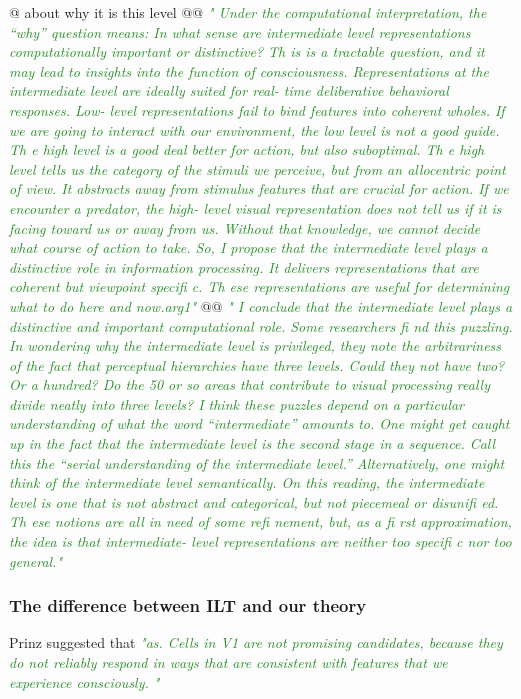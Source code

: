 \documentclass[utf8]{article}
\newenvironment{ants}
			{
			 \begin{easylist}[itemize]
			}
			{
			\end{easylist}
			}
\newcommand{\rewrite}[1]{\textcolor{ForestGreen}{\textit{"#1"}}\newline}
\begin{document}
\begin{ants}
			
				@ about why it is this level
				@@ \rewrite{
					Under the computational interpretation, the “why” question means: In what sense are intermediate level representations computationally important or distinctive? Th is is a tractable question, and it may lead to insights into the function of consciousness. Representations at the intermediate level are ideally suited for real- time deliberative behavioral responses. Low- level representations fail to bind features into coherent wholes. If we are going to interact with our environment, the low level is not a good guide. Th e high level is a good deal better for action, but also suboptimal. Th e high level tells us the category of the stimuli we perceive, but from an allocentric point of view. It abstracts away from stimulus features that are crucial for action. If we encounter a predator, the high- level visual representation does not tell us if it is facing toward us or away from us. Without that knowledge, we cannot decide what course of action to take. So, I propose that the intermediate level plays a distinctive role in information processing. It delivers representations that are coherent but viewpoint specifi c. Th ese representations are useful for determining what to do here and now.arg1} \cite{prinz2007intermediate}
				@@ \rewrite{
					I conclude that the intermediate level plays a distinctive and important computational role. Some researchers fi nd this puzzling. In wondering why the intermediate level is privileged, they note the arbitrariness of the fact that perceptual hierarchies have three levels. Could they not have two? Or a hundred? Do the 50 or so areas that contribute to visual processing really divide neatly into three levels? I think these puzzles depend on a particular understanding of what the word “intermediate” amounts to. One might get caught up in the fact that the intermediate level is the second stage in a sequence. Call this the “serial understanding of the intermediate level.” Alternatively, one might think of the intermediate level semantically. On this reading, the intermediate level is one that is not abstract and categorical, but not piecemeal or disunifi ed. Th ese notions are all in need of some refi nement, but, as a fi rst approximation, the idea is that intermediate- level representations are neither too specifi c nor too general.}\cite{prinz2007intermediate}
			\end{ants}
		
		
			\subsubsection{The difference between ILT and our theory}
				Prinz suggested that \rewrite{as. Cells in V1 are not promising candidates, because they do not reliably respond in ways that are consistent with features that we experience consciously. } \cite{prinz2007intermediate}
				
\end{document}
